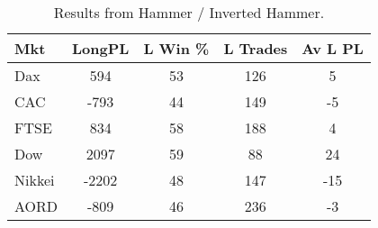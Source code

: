 \begin{table}[ht]
\centering
\caption[Hammer System]{Results from Hammer / Inverted Hammer.} 
\label{tab:hammer_results}
\begin{tabular}{lcccc}
  \toprule Mkt & LongPL & L Win \% & L Trades & Av L PL \\ 
  \midrule Dax & 594 & 53 & 126 & 5 \\ 
  CAC & -793 & 44 & 149 & -5 \\ 
  FTSE & 834 & 58 & 188 & 4 \\ 
  Dow & 2097 & 59 & 88 & 24 \\ 
  Nikkei & -2202 & 48 & 147 & -15 \\ 
  AORD & -809 & 46 & 236 & -3 \\ 
   \bottomrule \end{tabular}
\end{table}
